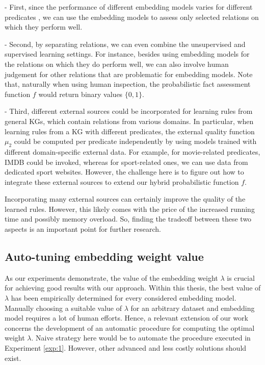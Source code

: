 \noindent- First, since the performance of different embedding models varies for different predicates \cite{Bordes:NIPS2013}, we can use the embedding models to assess only selected relations on which they perform well.

\noindent- Second, by separating relations, we can even combine the unsupervised and supervised learning settings. For instance, besides using embedding models for the relations on which they do perform well, we can also involve human judgement for other relations that are problematic for embedding models. Note that, naturally when using human inspection, the probabilistic fact assessment function $f$ would return binary values $\{0,1\}$.

\noindent- Third, different external sources could be incorporated for learning rules from general KGs, which contain relations from various domains. In particular, when learning rules from a KG with different predicates, the external quality function $\mu_2$ could be computed per predicate independently by using models trained with different domain-specific external data. For example, for movie-related predicates, IMDB could be invoked, whereas for sport-related ones, we can use data from dedicated sport websites. However, the challenge here is to figure out how to integrate these external sources to extend our hybrid probabilistic function $f$.

Incorporating many external sources can certainly improve the quality of the learned rules. However, this likely comes with the price of the increased running time and possibly memory overload. So, finding the tradeoff between these two aspects is an important point for further research.

\subsection{Auto-tuning embedding weight value}
As our experiments demonstrate, the value of the embedding weight $\lambda$ is crucial for achieving good results with our approach. Within this thesis, the best value of $\lambda$ has been empirically determined for every considered embedding model. Manually choosing a suitable value of $\lambda$ for an arbitrary dataset and embedding model requires a lot of human efforts. Hence, a relevant extension of our work concerns the development of an automatic procedure for computing the optimal weight $\lambda$. Naive strategy here would be to automate the procedure executed in Experiment \ref{exp:1}. However, other advanced and less costly solutions should exist.

